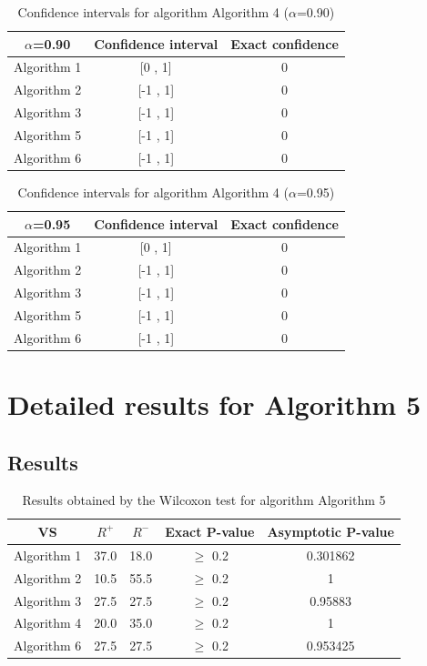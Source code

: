 \documentclass[a4paper,10pt]{article}
\begin{document}
\begin{table}[!htp]
\centering\small
\begin{tabular}{
|c|c|c|}
\hline
 $\alpha$=0.90 & Confidence interval & Exact confidence \\ \hline 
Algorithm 1 & [0 , 1] & 0\\ \hline 
Algorithm 2 & [-1 , 1] & 0\\ \hline 
Algorithm 3 & [-1 , 1] & 0\\ \hline 
Algorithm 5 & [-1 , 1] & 0\\ \hline 
Algorithm 6 & [-1 , 1] & 0\\ \hline 

\end{tabular}
\caption{Confidence intervals for algorithm Algorithm 4 ($\alpha$=0.90)}
\end{table}
\begin{table}[!htp]
\centering\small
\begin{tabular}{
|c|c|c|}
\hline
 $\alpha$=0.95 & Confidence interval & Exact confidence \\ \hline 
Algorithm 1 & [0 , 1] & 0\\ \hline 
Algorithm 2 & [-1 , 1] & 0\\ \hline 
Algorithm 3 & [-1 , 1] & 0\\ \hline 
Algorithm 5 & [-1 , 1] & 0\\ \hline 
Algorithm 6 & [-1 , 1] & 0\\ \hline 

\end{tabular}
\caption{Confidence intervals for algorithm Algorithm 4 ($\alpha$=0.95)}
\end{table}

 \clearpage 


\section{Detailed results for Algorithm 5}


\subsection{Results}

\begin{table}[!htp]
\centering\small
\begin{tabular}{
|c|c|c|c|c|}
\hline
 VS & $R^{+}$ & $R^{-}$ & Exact P-value & Asymptotic P-value \\ \hline 
Algorithm 1 & 37.0 & 18.0 & $\geq$ 0.2 & 0.301862\\ \hline 
Algorithm 2 & 10.5 & 55.5 & $\geq$ 0.2 & 1\\ \hline 
Algorithm 3 & 27.5 & 27.5 & $\geq$ 0.2 & 0.95883\\ \hline 
Algorithm 4 & 20.0 & 35.0 & $\geq$ 0.2 & 1\\ \hline 
Algorithm 6 & 27.5 & 27.5 & $\geq$ 0.2 & 0.953425\\ \hline 

\end{tabular}
\caption{Results obtained by the Wilcoxon test for algorithm Algorithm 5}
\end{table}
\end{document}
